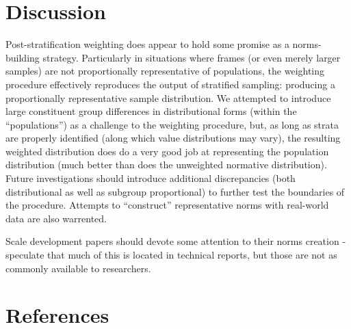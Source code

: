 \documentclass[
  ,man]{apa7}
\begin{document}
\hypertarget{discussion}{%
\section{Discussion}\label{discussion}}

Post-stratification weighting does appear to hold some promise as a norms-building strategy. Particularly in situations where frames (or even merely larger samples) are not proportionally representative of populations, the weighting procedure effectively reproduces the output of stratified sampling: producing a proportionally representative sample distribution. We attempted to introduce large constituent group differences in distributional forms (within the ``populations'') as a challenge to the weighting procedure, but, as long as strata are properly identified (along which value distributions may vary), the resulting weighted distribution does do a very good job at representing the population distribution (much better than does the unweighted normative distribution). Future investigations should introduce additional discrepancies (both distributional as well as subgroup proportional) to further test the boundaries of the procedure. Attempts to ``construct'' representative norms with real-world data are also warrented.

Scale development papers should devote some attention to their norms creation - speculate that much of this is located in technical reports, but those are not as commonly available to researchers.

\newpage

\hypertarget{references}{%
\section{References}\label{references}}

\begingroup
\setlength{\parindent}{-0.5in}
\setlength{\leftskip}{0.5in}
\end{document}
